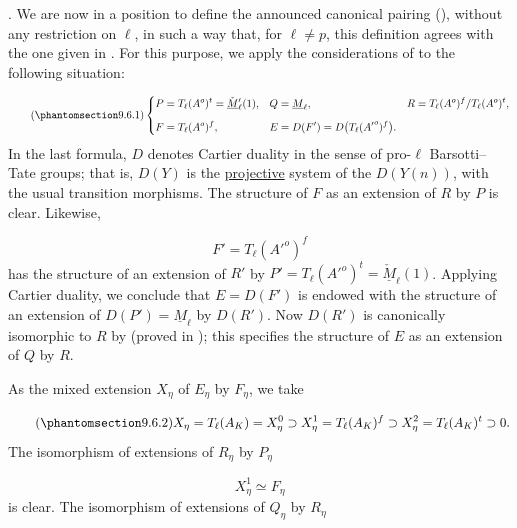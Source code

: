 
\medskip
\noindent
{}. We are now in a position to define the announced canonical pairing
(), without any restriction on $\ell$, in such a way that, for
$\ell\neq p$, this definition agrees with the one given in . For this
purpose, we apply the considerations of  to the following situation:

\begin{equation}\tag{\SGARefTarget{sga7.sga7i.eix.n9-6-1}{9.6.1}}
\left\{
\begin{aligned}
P&=T_\ell(A^o)^t=\check{\underline M}{}'_\ell(1),
& Q&=\underline M_\ell,
& R&=T_\ell(A^o)^f/T_\ell(A^o)^t,\\[1.25ex]
F&=T_\ell(A^o)^f,
& E&=D(F')=D\bigl(T_\ell({A'}^o)^f\bigr).
\end{aligned}
\right.
\end{equation}
In the last formula, $D$ denotes Cartier duality in the sense of
pro-$\ell$ Barsotti--Tate groups; that is, $D(Y)$ is the
\underline{projective} system of the $D(Y(n))$, with the usual transition
morphisms. The structure of $F$ as an extension of $R$ by $P$ is clear.
Likewise,

\begin{equation*}
F'=T_\ell({A'}^o)^f
\end{equation*}
has the structure of an extension of $R'$ by
$P'=T_\ell({A'}^o)^t=\check{\underline M}_\ell(1)$. Applying Cartier
duality, we conclude that $E=D(F')$ is endowed with the structure of an
extension of $D(P')=\underline M_\ell$ by $D(R')$. Now $D(R')$ is
canonically isomorphic to $R$ by  (proved in ); this specifies the
structure of $E$ as an extension of $Q$ by $R$.

As the mixed extension $X_\eta$ of $E_\eta$ by $F_\eta$, we take

\begin{equation}\tag{\SGARefTarget{sga7.sga7i.eix.n9-6-2}{9.6.2}}
X_\eta=T_\ell(A_K)=X^0_\eta
 \supset X^1_\eta=T_\ell(A_K)^f
 \supset X^2_\eta=T_\ell(A_K)^t
 \supset0.
\end{equation}
The isomorphism of extensions of $R_\eta$ by $P_\eta$

\begin{equation*}
X^1_\eta\simeq F_\eta
\end{equation*}
is clear. The isomorphism of extensions of $Q_\eta$ by $R_\eta$

